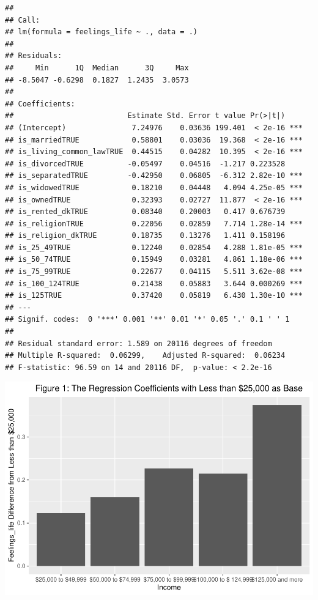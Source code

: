 \documentclass[]{article}
\begin{document}
\begin{verbatim}
## 
## Call:
## lm(formula = feelings_life ~ ., data = .)
## 
## Residuals:
##     Min      1Q  Median      3Q     Max 
## -8.5047 -0.6298  0.1827  1.2435  3.0573 
## 
## Coefficients:
##                          Estimate Std. Error t value Pr(>|t|)    
## (Intercept)               7.24976    0.03636 199.401  < 2e-16 ***
## is_marriedTRUE            0.58801    0.03036  19.368  < 2e-16 ***
## is_living_common_lawTRUE  0.44515    0.04282  10.395  < 2e-16 ***
## is_divorcedTRUE          -0.05497    0.04516  -1.217 0.223528    
## is_separatedTRUE         -0.42950    0.06805  -6.312 2.82e-10 ***
## is_widowedTRUE            0.18210    0.04448   4.094 4.25e-05 ***
## is_ownedTRUE              0.32393    0.02727  11.877  < 2e-16 ***
## is_rented_dkTRUE          0.08340    0.20003   0.417 0.676739    
## is_religionTRUE           0.22056    0.02859   7.714 1.28e-14 ***
## is_religion_dkTRUE        0.18735    0.13276   1.411 0.158196    
## is_25_49TRUE              0.12240    0.02854   4.288 1.81e-05 ***
## is_50_74TRUE              0.15949    0.03281   4.861 1.18e-06 ***
## is_75_99TRUE              0.22677    0.04115   5.511 3.62e-08 ***
## is_100_124TRUE            0.21438    0.05883   3.644 0.000269 ***
## is_125TRUE                0.37420    0.05819   6.430 1.30e-10 ***
## ---
## Signif. codes:  0 '***' 0.001 '**' 0.01 '*' 0.05 '.' 0.1 ' ' 1
## 
## Residual standard error: 1.589 on 20116 degrees of freedom
## Multiple R-squared:  0.06299,    Adjusted R-squared:  0.06234 
## F-statistic: 96.59 on 14 and 20116 DF,  p-value: < 2.2e-16
\end{verbatim}

\includegraphics{ProblemSet2-template_files/figure-latex/unnamed-chunk-4-1.pdf}
\end{document}
